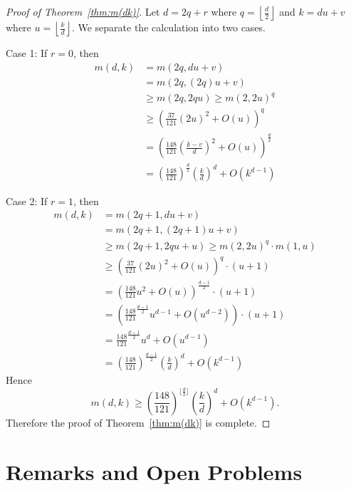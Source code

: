 \documentclass[11pt]{article}
\theoremstyle{definition}
\begin{document}
\begin{proof}[Proof of Theorem~\ref{thm:m(dk)}]
Let $d = 2q +r$ where $q =\displaystyle\left \lfloor \frac{d}{2}\right\rfloor$ and $k = du +v$ where $u =\displaystyle \left \lfloor \frac{k}{d}\right\rfloor$. We separate the calculation into two cases.

Case 1: If $r = 0$, then
\begin{align*}
m(d,k) &= m(2q, du +v)\\
&= m(2q, (2q)u +v)\\
&\geq m(2q, 2qu) \geq m(2, 2u)^q\\
&\geq \left(\frac{37}{121}(2u)^2+ O(u)\right)^q \\
&= \left(\frac{148}{121} \left(\frac{k-v}{d}\right) ^2+ O(u)\right)^{ \frac{d}{2}}\\
&= \left(\frac{148}{121}\right)^{ \frac{d}{2}}\left(\frac{k}{d}\right)^d + O(k^{d-1})
\end{align*}

Case 2: If $r = 1$, then
\begin{align*}
m(d,k) &= m(2q+1, du +v)\\
&= m(2q+1, (2q+1)u +v)\\
&\geq m(2q+1, 2qu + u) \geq m(2, 2u)^q \cdot m(1,u)\\
&\geq \left(\frac{37}{121}(2u)^2+ O(u)\right)^q \cdot (u+1) \\
&= \left(\frac{148}{121} u^2 + O(u)\right)^{ \frac{d-1}{2}} \cdot (u+1)\\
&= \left(\frac{148}{121}^{ \frac{d-1}{2}} u ^{d-1}+ O(u^{d-2})\right) \cdot (u+1)\\
&= \frac{148}{121}^{ \frac{d-1}{2}} u ^{d}+ O(u^{d-1})\\
&= \left(\frac{148}{121}\right)^{ \frac{d-1}{2}}\left(\frac{k}{d}\right)^d + O(k^{d-1})
\end{align*}
Hence 
\[
m(d,k) \geq \left(\frac{148}{121}\right)^{\lfloor \frac{d}{2}\rfloor}\left(\frac{k}{d}\right)^d + O(k^{d-1}).
\]
Therefore the proof of Theorem~\ref{thm:m(dk)} is complete.
\end{proof}



\section{Remarks and Open Problems}
\end{document}
